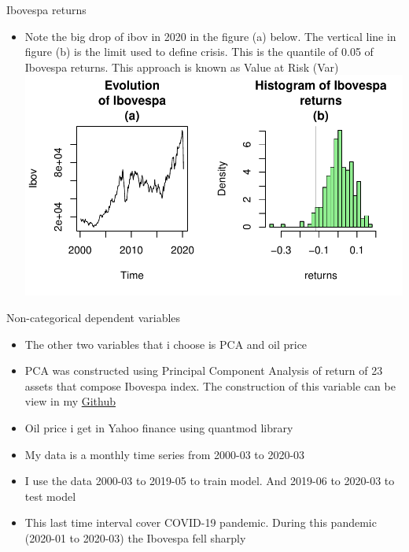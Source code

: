 \documentclass[
  10pt,
  ignorenonframetext,
]{beamer}
\providecommand{\tightlist}{%
  \setlength{\itemsep}{0pt}\setlength{\parskip}{0pt}}
\begin{document}
\begin{frame}{Ibovespa returns}
\protect\hypertarget{ibovespa-returns}{}

\begin{itemize}
\tightlist
\item
  Note the big drop of ibov in 2020 in the figure (a) below. The
  vertical line in figure (b) is the limit used to define crisis. This
  is the quantile of 0.05 of Ibovespa returns. This approach is known as
  Value at Risk (Var)
  \includegraphics{MJ_Ribeiro_files/figure-beamer/unnamed-chunk-28-1.pdf}
\end{itemize}

\end{frame}

\begin{frame}{Non-categorical dependent variables}
\protect\hypertarget{non-categorical-dependent-variables}{}

\begin{itemize}
\tightlist
\item
  The other two variables that i choose is PCA and oil price
\item
  PCA was constructed using Principal Component Analysis of return of 23
  assets that compose Ibovespa index. The construction of this variable
  can be view in my
  \href{https://github.com/mj-ribeiro/College-works/blob/master/eco_fin/pca_risk_ecofin.R}{Github}
\item
  Oil price i get in Yahoo finance using quantmod library
\item
  My data is a monthly time series from 2000-03 to 2020-03
\item
  I use the data 2000-03 to 2019-05 to train model. And 2019-06 to
  2020-03 to test model
\item
  This last time interval cover COVID-19 pandemic. During this pandemic
  (2020-01 to 2020-03) the Ibovespa fell sharply
\end{itemize}

\end{frame}
\end{document}
